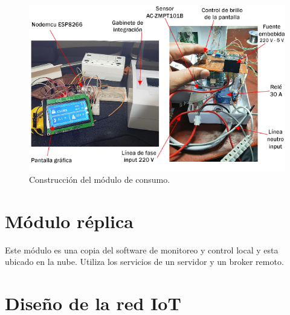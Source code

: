 \begin{enumerate}
\begin{figure}[htpb]
\centering 
\includegraphics[width=1.0\textwidth]{./Figures/moduloconsumo.png}
\caption{Construcción del módulo de consumo.}
\label{fig:modconsumo}
\end{figure}


\end{enumerate}
\section{Módulo réplica}
Este módulo es una copia del software de monitoreo y control local y esta ubicado en la nube. Utiliza los servicios de un servidor y un broker remoto.




\section{Diseño de la red IoT}

